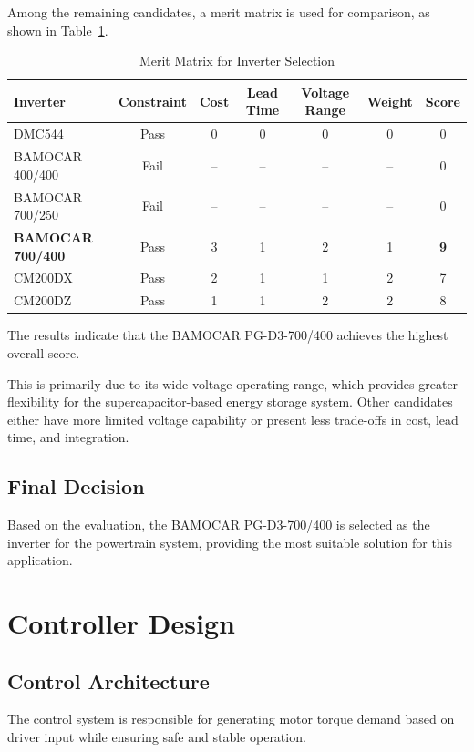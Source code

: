 \documentclass[11pt, a4paper]{report}
\numberwithin{equation}{section}
\begin{document}
Among the remaining candidates, a merit matrix is used for comparison, as shown in Table~\ref{tab:inverter_selection}.

\begin{table}[H]
\centering
\caption{Merit Matrix for Inverter Selection}
\label{tab:inverter_selection}
\begin{tabular}{lcccccc}
\toprule
Inverter & Constraint & Cost & Lead Time & Voltage Range & Weight & Score \\
\midrule
DMC544 & Pass & 0 & 0 & 0 & 0 & 0 \\
BAMOCAR 400/400 & Fail & -- & -- & -- & -- & 0 \\
BAMOCAR 700/250 & Fail & -- & -- & -- & -- & 0 \\
\textbf{BAMOCAR 700/400} & Pass & 3 & 1 & 2 & 1 & \textbf{9} \\
CM200DX & Pass & 2 & 1 & 1 & 2 & 7 \\
CM200DZ & Pass & 1 & 1 & 2 & 2 & 8 \\
\bottomrule
\end{tabular}
\end{table}

The results indicate that the BAMOCAR PG-D3-700/400 achieves the highest overall score.

This is primarily due to its wide voltage operating range, which provides greater flexibility for the supercapacitor-based energy storage system. Other candidates either have more limited voltage capability or present less trade-offs in cost, lead time, and integration.

\subsection{Final Decision}

Based on the evaluation, the BAMOCAR PG-D3-700/400 is selected as the inverter for the powertrain system, providing the most suitable solution for this application.

\section{Controller Design}

\subsection{Control Architecture}

The control system is responsible for generating motor torque demand based on driver input while ensuring safe and stable operation.
\end{document}
